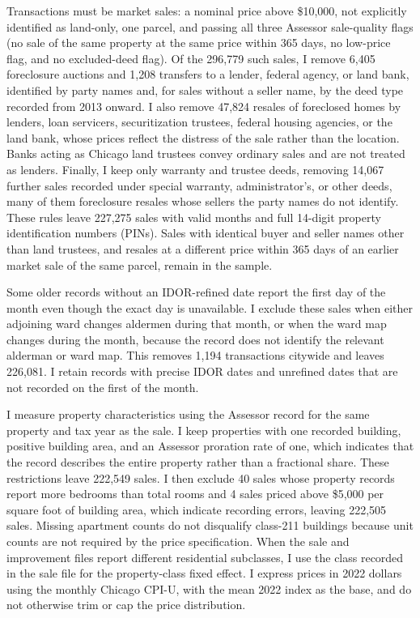 Transactions must be market sales: a nominal price above \$10,000, not explicitly identified as land-only, one parcel, and passing all three Assessor sale-quality flags (no sale of the same property at the same price within 365 days, no low-price flag, and no excluded-deed flag).
Of the 296,779 such sales, I remove 6,405 foreclosure auctions and 1,208 transfers to a lender, federal agency, or land bank, identified by party names and, for sales without a seller name, by the deed type recorded from 2013 onward.
I also remove 47,824 resales of foreclosed homes by lenders, loan servicers, securitization trustees, federal housing agencies, or the land bank, whose prices reflect the distress of the sale rather than the location.
Banks acting as Chicago land trustees convey ordinary sales and are not treated as lenders.
Finally, I keep only warranty and trustee deeds, removing 14,067 further sales recorded under special warranty, administrator's, or other deeds, many of them foreclosure resales whose sellers the party names do not identify.
These rules leave 227,275 sales with valid months and full 14-digit property identification numbers (PINs).
Sales with identical buyer and seller names other than land trustees, and resales at a different price within 365 days of an earlier market sale of the same parcel, remain in the sample.

Some older records without an IDOR-refined date report the first day of the month even though the exact day is unavailable.
I exclude these sales when either adjoining ward changes aldermen during that month, or when the ward map changes during the month, because the record does not identify the relevant alderman or ward map.
This removes 1,194 transactions citywide and leaves 226,081.
I retain records with precise IDOR dates and unrefined dates that are not recorded on the first of the month.

I measure property characteristics using the Assessor record for the same property and tax year as the sale.
I keep properties with one recorded building, positive building area, and an Assessor proration rate of one, which indicates that the record describes the entire property rather than a fractional share.
These restrictions leave 222,549 sales.
I then exclude 40 sales whose property records report more bedrooms than total rooms and 4 sales priced above \$5,000 per square foot of building area, which indicate recording errors, leaving 222,505 sales.
Missing apartment counts do not disqualify class-211 buildings because unit counts are not required by the price specification.
When the sale and improvement files report different residential subclasses, I use the class recorded in the sale file for the property-class fixed effect.
I express prices in 2022 dollars using the monthly Chicago CPI-U, with the mean 2022 index as the base, and do not otherwise trim or cap the price distribution.

